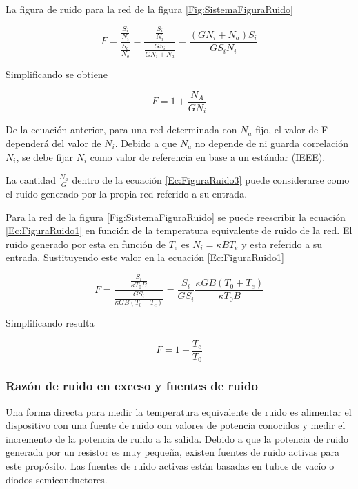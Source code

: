 \documentclass{article}
\begin{document}
	La figura de ruido para la red de la figura \ref{Fig:SistemaFiguraRuido} 
	
	\begin{equation}
		F = \frac{\frac{S_i}{N_i}}{\frac{S_o}{N_o}} = \frac{\frac{S_i}{N_i}}{\frac{GS_i}{GN_i+N_a}} = \frac{(GN_i+N_a)S_i}{GS_iN_i}
		\label{Ec:FiguraRuido2}
	\end{equation}		
	
	Simplificando se obtiene
	
	\begin{equation}
		F = 1  + \frac{N_A}{GN_i}
		\label{Ec:FiguraRuido3}
	\end{equation}			
	
	De la ecuación anterior, para una red determinada con $N_a$ fijo, el valor de F dependerá del valor de $N_i$. Debido a que $N_a$ no depende de ni guarda correlación $N_i$, se debe fijar $N_i$ como valor de referencia en base a un estándar (IEEE).		
	
	La cantidad $\frac{N_a}{G}$ dentro de la ecuación \eqref{Ec:FiguraRuido3} puede considerarse como el ruido generado por la propia red referido a su entrada. 
	
	Para la red de la figura \ref{Fig:SistemaFiguraRuido} se puede reescribir la ecuación \eqref{Ec:FiguraRuido1} en función de la temperatura equivalente de ruido de la red. El ruido generado por esta en función de $T_e$ es $N_i = {\kappa}BT_e$ y esta referido a su entrada. Sustituyendo este valor en la ecuación \eqref{Ec:FiguraRuido1}
	
	\begin{equation}
		F = \frac{\frac{S_i}{{\kappa}T_0B}}{\frac{GS_i}{{\kappa}GB(T_0 + T_e)}}=\frac{S_i}{GS_i}\frac{{\kappa}GB(T_0 + T_e)}{{\kappa}T_0B}
	\end{equation}
	
	Simplificando resulta
	
	\begin{equation}
		F = 1 + \frac{T_e}{T_0}
		\label{Ec:FiguraRuido4}
	\end{equation}	
	
	\subsubsection{Razón de ruido en exceso y fuentes de ruido}
	
	Una forma directa para medir la temperatura equivalente de ruido es alimentar el dispositivo con una fuente de ruido con valores de potencia conocidos y medir el incremento de la potencia de ruido a la salida. Debido a que la potencia de ruido generada por un resistor es muy pequeña, existen fuentes de ruido activas para este propósito. Las fuentes de ruido activas están basadas en tubos de vacío o diodos semiconductores.
	
\end{document}

